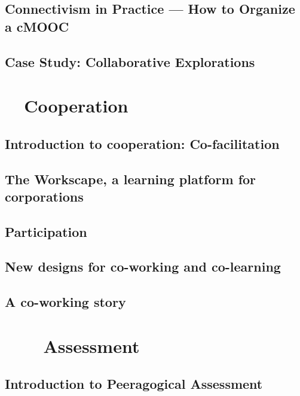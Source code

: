 \documentclass[ebook, 12pt, twoside]{memoir}
\begin{document}
\chapter[\textbf{How to Organize a MOOC}]{ Connectivism in Practice ---  How to Organize a cMOOC}
%

%
\chapter[\textbf{Case Study: Collaborative Explorations}]{ Case Study: Collaborative Explorations}
%



\part{~~Cooperation} \label{cooperation-part} %
%
\chapter[\textbf{Co-facilitation}]{Introduction to cooperation: Co-facilitation}

%
\chapter[\textbf{The Workscape}]{ The Workscape, a learning platform for corporations }
%

\chapter[\textbf{Participation}]{ Participation }
%

%
\chapter[\textbf{Designs for co-working}]{New designs for co-working and co-learning}
%

%
\chapter[\textbf{A co-working story}]{A co-working story}
%




\part{~~~~Assessment} \label{assessment-part} %
%
\chapter[\textbf{Peeragogical Assessment}]{Introduction to Peeragogical Assessment}

%
\end{document}
